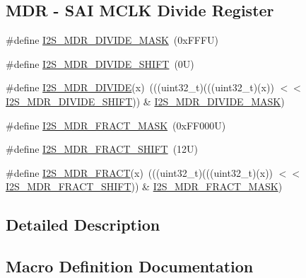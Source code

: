 \subsection*{M\+DR -\/ S\+AI M\+C\+LK Divide Register}
\begin{DoxyCompactItemize}
\item 
\#define \mbox{\hyperlink{group___i2_s___register___masks_ga3b44d8acfaecde14d97877635d471e13}{I2\+S\+\_\+\+M\+D\+R\+\_\+\+D\+I\+V\+I\+D\+E\+\_\+\+M\+A\+SK}}~(0x\+F\+F\+F\+U)
\item 
\#define \mbox{\hyperlink{group___i2_s___register___masks_ga96fc58c33527f6dba2be28151ecdb6b2}{I2\+S\+\_\+\+M\+D\+R\+\_\+\+D\+I\+V\+I\+D\+E\+\_\+\+S\+H\+I\+FT}}~(0\+U)
\item 
\#define \mbox{\hyperlink{group___i2_s___register___masks_ga12b79478094d1367a54d08fd0372546d}{I2\+S\+\_\+\+M\+D\+R\+\_\+\+D\+I\+V\+I\+DE}}(x)~(((uint32\+\_\+t)(((uint32\+\_\+t)(x)) $<$$<$ \mbox{\hyperlink{group___i2_s___register___masks_ga96fc58c33527f6dba2be28151ecdb6b2}{I2\+S\+\_\+\+M\+D\+R\+\_\+\+D\+I\+V\+I\+D\+E\+\_\+\+S\+H\+I\+FT}})) \& \mbox{\hyperlink{group___i2_s___register___masks_ga3b44d8acfaecde14d97877635d471e13}{I2\+S\+\_\+\+M\+D\+R\+\_\+\+D\+I\+V\+I\+D\+E\+\_\+\+M\+A\+SK}})
\item 
\#define \mbox{\hyperlink{group___i2_s___register___masks_ga0686acbd342566fcf227b91122b901cc}{I2\+S\+\_\+\+M\+D\+R\+\_\+\+F\+R\+A\+C\+T\+\_\+\+M\+A\+SK}}~(0x\+F\+F000\+U)
\item 
\#define \mbox{\hyperlink{group___i2_s___register___masks_gab4cc6d27bd245719343b0e868ffb4bb4}{I2\+S\+\_\+\+M\+D\+R\+\_\+\+F\+R\+A\+C\+T\+\_\+\+S\+H\+I\+FT}}~(12\+U)
\item 
\#define \mbox{\hyperlink{group___i2_s___register___masks_ga1a70c2cf16e7bfff509b937099b4914b}{I2\+S\+\_\+\+M\+D\+R\+\_\+\+F\+R\+A\+CT}}(x)~(((uint32\+\_\+t)(((uint32\+\_\+t)(x)) $<$$<$ \mbox{\hyperlink{group___i2_s___register___masks_gab4cc6d27bd245719343b0e868ffb4bb4}{I2\+S\+\_\+\+M\+D\+R\+\_\+\+F\+R\+A\+C\+T\+\_\+\+S\+H\+I\+FT}})) \& \mbox{\hyperlink{group___i2_s___register___masks_ga0686acbd342566fcf227b91122b901cc}{I2\+S\+\_\+\+M\+D\+R\+\_\+\+F\+R\+A\+C\+T\+\_\+\+M\+A\+SK}})
\end{DoxyCompactItemize}


\subsection{Detailed Description}


\subsection{Macro Definition Documentation}
\mbox{\label{group___i2_s___register___masks_gadb0838291c90975e284e5f6a112f5877}} 

